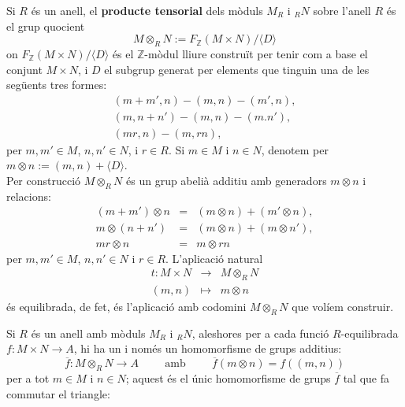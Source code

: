 \begin{definition}
 Si $R$ és un anell, el \textbf{producte tensorial} dels mòduls $M_R$ i $_R{N}$ sobre l'anell $R$ és el grup quocient
$$
M \otimes_R N := F_{\mathbb{Z}}(M\times N)/\langle D \rangle 
$$
on  $F_{\mathbb{Z}}(M\times N)/\langle D \rangle $ és el $\mathbb{Z}$-mòdul lliure construït per tenir com a base el conjunt $M\times N$, i $D$ el subgrup generat per elements que tinguin una de les següents tres formes:
\begin{eqnarray*}
(m+m',n) - (m,n) - (m',n), \\
(m,n+n') - (m,n) - (m.n'), \\
(mr,n)-(m,rn),
\end{eqnarray*}
per $m,m'\in M$, $n,n'\in N$, i $r\in R$. Si $m\in M$ i $n\in N$, denotem per $m\otimes n:=(m,n)+\langle D \rangle$.\\
\hspace*{.5cm} Per construcció $M\otimes_R N$ és un grup abelià additiu amb generadors $m\otimes n$ i relacions:
\begin{eqnarray*}
(m+m')\otimes n &=& (m \otimes n) + (m'\otimes n),\\
m\otimes(n+n') &=& (m \otimes n) + (m \otimes n'),\\
mr\otimes n &=& m \otimes rn
\end{eqnarray*}
per $m,m'\in M$, $n,n'\in N$ i $r\in R$. L'aplicació natural 
\begin{eqnarray*}
t: M\times N &\rightarrow &M\otimes_R N \\
(m,n) &\mapsto & m\otimes n
\end{eqnarray*}
és equilibrada, de fet, és l'aplicació amb codomini $M\otimes_R N$ que volíem construir.
\\
\end{definition}

\begin{prop}
Si $R$ és un anell amb mòduls $M_R$ i $_R{N}$, aleshores per a cada funció $R$-equilibrada $f:M\times N \rightarrow A$, hi ha un i només un homomorfisme de grups additius:
$$
\overline{f}:M\otimes_R N \rightarrow A \hspace{1cm} \text{amb}\hspace{1cm}\overline{f}(m\otimes n) = f((m,n))
$$ 
per a tot $m\in M$ i $n\in N$; aquest és el únic homomorfisme de grups $\overline{f}$ tal que fa commutar el triangle:

\begin{center}
\end{center}
\end{prop}

